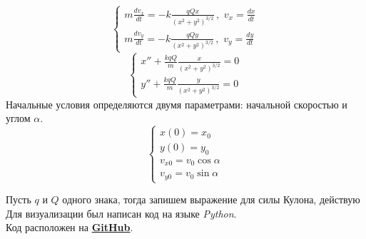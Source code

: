 \documentclass[a5paper, 10pt]{article}
\theoremstyle{definition}
\theoremstyle{plain}
\theoremstyle{remark}
\begin{document}
\begin{equation}
\begin{cases}
m \frac{dv_x}{dt} = -k \frac{qQx}{\left(x^2 + y^2 \right)^{3/2}} \, , \, \, v_x = \frac{dx}{dt}\\
m \frac{dv_y}{dt} = -k \frac{qQy}{\left(x^2 + y^2 \right)^{3/2}} \, , \, \, v_y = \frac{dy}{dt}
\end{cases}
\end{equation}
\begin{equation}
\begin{cases}
 x'' + \frac{k q Q}{m} \frac{x}{\left(x^2 + y^2 \right)^{3/2}} = 0 \\
 y'' + \frac{k q Q}{m} \frac{y}{\left(x^2 + y^2 \right)^{3/2}} = 0
\end{cases}
\end{equation}
Начальные условия определяются двумя параметрами: начальной скоростью и углом $\alpha$.\\
\begin{equation}
\begin{cases}
x(0) = x_0\\
y(0) = y_0\\
v_{x0} = v_0 \cos \alpha\\
v_{y0} = v_0 \sin \alpha
\end{cases}
\end{equation}




\newpage
Пусть $q$ и $Q$ одного знака, тогда запишем выражение для силы Кулона, действую
\\
Для визуализации был написан код на языке \textit{Python}. \\
Код расположен на \href{https://github.com/a-nechaeva/practical_Linal/tree/main/lab4}{\textbf{GitHub}}.
\end{document}
